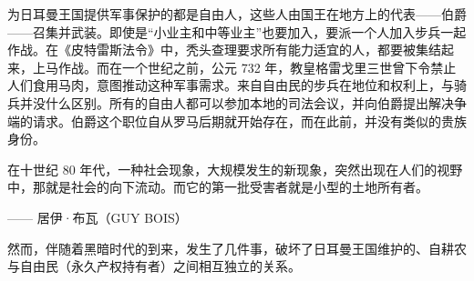 为日耳曼王国提供军事保护的都是自由人，这些人由国王在地方上的代表——伯爵——召集并武装。即使是“小业主和中等业主”也要加入，要派一个人加入步兵一起作战。在《皮特雷斯法令》中，秃头查理要求所有能力适宜的人，都要被集结起来，上马作战。而在一个世纪之前，公元 732 年，教皇格雷戈里三世曾下令禁止人们食用马肉，意图推动这种军事需求。来自自由民的步兵在地位和权利上，与骑兵并没什么区别。所有的自由人都可以参加本地的司法会议，并向伯爵提出解决争端的请求。伯爵这个职位自从罗马后期就开始存在，而在此前，并没有类似的贵族身份。


\begin{tcolorbox}
在十世纪 80 年代，一种社会现象，大规模发生的新现象，突然出现在人们的视野中，那就是社会的向下流动。而它的第一批受害者就是小型的土地所有者。
\begin{flushright}
—— 居伊·布瓦（GUY BOIS）
\end{flushright}
\end{tcolorbox}

然而，伴随着黑暗时代的到来，发生了几件事，破坏了日耳曼王国维护的、自耕农与自由民（永久产权持有者）之间相互独立的关系。

